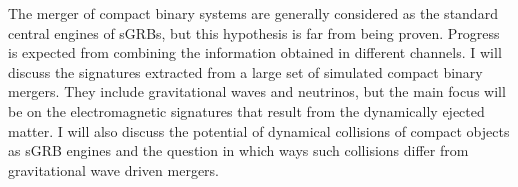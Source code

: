 


\bigskip



\bigskip

\noindent The merger of compact binary systems are generally considered as the standard
central engines of sGRBs, but this hypothesis is far from being proven.
Progress is expected from combining the information obtained in different channels.
I will discuss the signatures extracted from a large set of simulated compact binary
mergers. They include gravitational waves and neutrinos, but the main focus will be
on the electromagnetic signatures that result from the dynamically ejected
matter. I will also discuss the potential of dynamical collisions of compact objects
as sGRB engines and the question in which ways such collisions differ from
gravitational wave driven mergers.

